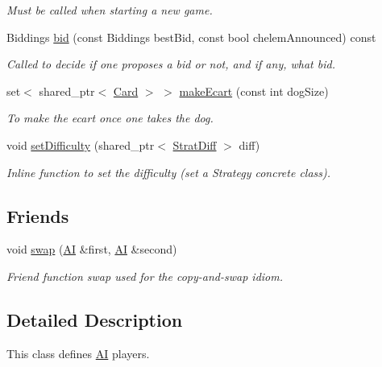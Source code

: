 \begin{DoxyCompactItemize}
\begin{DoxyCompactList}\small\item\em \-Must be called when starting a new game. \end{DoxyCompactList}\item 
\-Biddings \hyperlink{classAI_a9e2fd7ff440ada8339135c23b73e1a96}{bid} (const \-Biddings best\-Bid, const bool chelem\-Announced) const 
\begin{DoxyCompactList}\small\item\em \-Called to decide if one proposes a bid or not, and if any, what bid. \end{DoxyCompactList}\item 
set$<$ shared\-\_\-ptr$<$ \hyperlink{classCard}{\-Card} $>$ $>$ \hyperlink{classAI_ad12a3efd1da4acc6e1855bd7262779e3}{make\-Ecart} (const int dog\-Size)
\begin{DoxyCompactList}\small\item\em \-To make the ecart once one takes the dog. \end{DoxyCompactList}\item 
void \hyperlink{classAI_a19cae044bb7f221819f61b017b6a7ffe}{set\-Difficulty} (shared\-\_\-ptr$<$ \hyperlink{classStratDiff}{\-Strat\-Diff} $>$ diff)
\begin{DoxyCompactList}\small\item\em \-Inline function to set the difficulty (set a \-Strategy concrete class). \end{DoxyCompactList}\end{DoxyCompactItemize}
\subsection*{\-Friends}
\begin{DoxyCompactItemize}
\item 
void \hyperlink{classAI_a6c2a2d1ac6ecf7362dc45ce9d16e0e49}{swap} (\hyperlink{classAI}{\-A\-I} \&first, \hyperlink{classAI}{\-A\-I} \&second)
\begin{DoxyCompactList}\small\item\em \-Friend function swap used for the copy-\/and-\/swap idiom. \end{DoxyCompactList}\end{DoxyCompactItemize}


\subsection{\-Detailed \-Description}
\-This class defines \hyperlink{classAI}{\-A\-I} players. 

